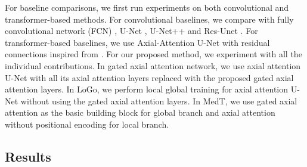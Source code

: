 \documentclass[runningheads]{llncs}
\begin{document}
	For baseline comparisons, we first run experiments on both convolutional and transformer-based methods. For convolutional baselines, we compare with fully convolutional network (FCN) \cite{badrinarayanan2017segnet}, U-Net \cite{ronneberger2015u}, U-Net++ \cite{zhou2018unet++} and Res-Unet \cite{xiao2018weighted}. For transformer-based baselines, we use Axial-Attention U-Net with residual connections inspired from \cite{wang2020axial}. For our proposed method, we experiment with all the individual contributions. In gated axial attention network, we use axial attention U-Net with all its axial attention layers replaced with the proposed gated axial attention layers. In LoGo, we perform local global training for axial attention U-Net without using the gated axial attention layers. In MedT, we use gated axial attention as the basic building block for global branch and axial attention without positional encoding for local branch.
	
	\subsection{Results}
	
\end{document}
